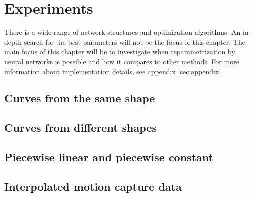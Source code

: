 
\section{Experiments}
There is a wide range of network structures and optimization algorithms. An in-depth search for the best parameters will not be the focus of this chapter. The main focus of this chapter will be to investigate when reparametrization by neural networks is possible and how it compares to other methods. For more information about implementation details, see appendix \ref{sec:appendix}.




\subsection{Curves from the same shape}\label{subsec:case_1}


\FloatBarrier
\subsection{Curves from different shapes}\label{subsec:case_2}


\FloatBarrier
\subsection{Piecewise linear and piecewise constant}


\FloatBarrier
\subsection{Interpolated motion capture data}

